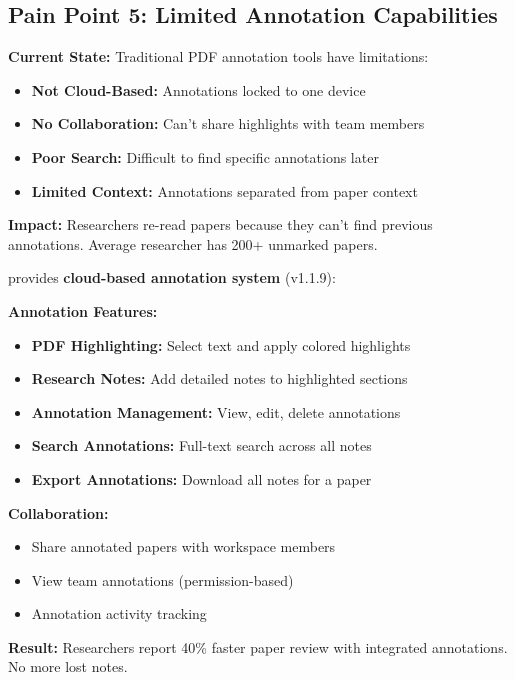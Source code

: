 \subsection{Pain Point 5: Limited Annotation Capabilities}
\label{subsec:pain-annotation}

\begin{warningbox}
\textbf{Current State:} Traditional PDF annotation tools have limitations:
\begin{itemize}
    \item \textbf{Not Cloud-Based:} Annotations locked to one device
    \item \textbf{No Collaboration:} Can't share highlights with team members
    \item \textbf{Poor Search:} Difficult to find specific annotations later
    \item \textbf{Limited Context:} Annotations separated from paper context
\end{itemize}

\textbf{Impact:} Researchers re-read papers because they can't find previous annotations. Average researcher has 200+ unmarked papers.
\end{warningbox}

\begin{successbox}
\projectname{} provides \textbf{cloud-based annotation system} (v1.1.9):

\textbf{Annotation Features:}
\begin{itemize}
    \item \textbf{PDF Highlighting:} Select text and apply colored highlights
    \item \textbf{Research Notes:} Add detailed notes to highlighted sections
    \item \textbf{Annotation Management:} View, edit, delete annotations
    \item \textbf{Search Annotations:} Full-text search across all notes
    \item \textbf{Export Annotations:} Download all notes for a paper
\end{itemize}

\textbf{Collaboration:}
\begin{itemize}
    \item Share annotated papers with workspace members
    \item View team annotations (permission-based)
    \item Annotation activity tracking
\end{itemize}

\textbf{Result:} Researchers report 40\% faster paper review with integrated annotations. No more lost notes.
\end{successbox}

